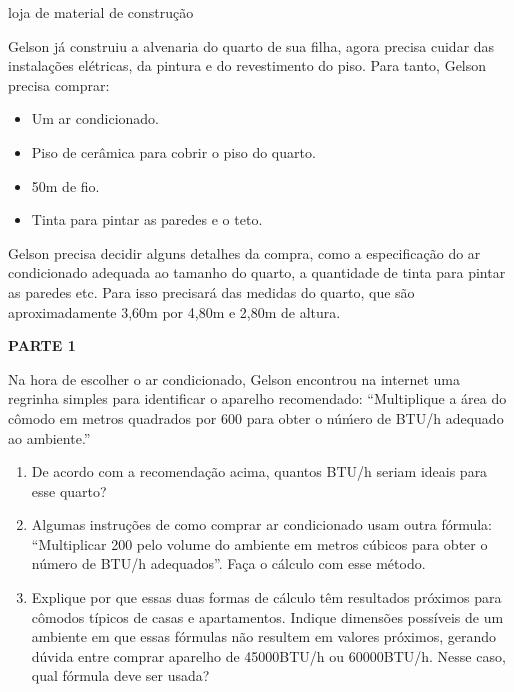 \label{\detokenize{GE504-2::doc}}\label{\detokenize{GE504-2:explorando-dimensao}}
\begin{task}{loja de material de construção}



Gelson já construiu a alvenaria do quarto de sua filha, agora precisa cuidar das instalações elétricas, da pintura e do revestimento do piso. Para tanto, Gelson precisa comprar:
\begin{itemize}
\item {} 
Um ar condicionado.

\item {} 
Piso de cerâmica para cobrir o piso do quarto.

\item {} 
50m de fio.

\item {} 
Tinta para pintar as paredes e o teto.

\end{itemize}

Gelson precisa decidir alguns detalhes da compra, como a especificação do ar condicionado adequada ao tamanho do quarto, a quantidade de tinta para pintar as paredes etc. Para isso precisará das medidas do quarto, que são aproximadamente 3,60m por 4,80m e 2,80m de altura.

\textbf{PARTE 1}

Na hora de escolher o ar condicionado, Gelson encontrou na internet uma regrinha simples para identificar o aparelho recomendado: “Multiplique a área do cômodo em metros quadrados por 600 para obter o núḿero de BTU/h adequado ao ambiente.”
\begin{enumerate}
\item {} 
De acordo com a recomendação acima, quantos BTU/h seriam ideais para esse quarto?

\item {} 
Algumas instruções de como comprar ar condicionado usam outra fórmula: “Multiplicar 200 pelo volume do ambiente em metros cúbicos para obter o número de BTU/h adequados”. Faça o cálculo com esse método.

\item {} 
Explique por que essas duas formas de cálculo têm resultados próximos para cômodos típicos de casas e apartamentos. Indique dimensões possíveis de um ambiente em que essas fórmulas não resultem em valores próximos, gerando dúvida entre comprar aparelho de 45000BTU/h ou 60000BTU/h. Nesse caso, qual fórmula deve ser usada?


\end{enumerate}
\end{task}

